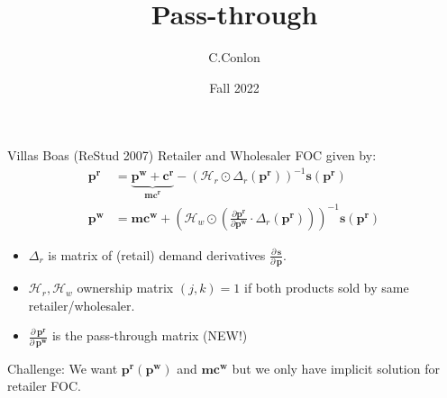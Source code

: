 

\title []{Pass-through}
\author{C.Conlon }
\date{Fall 2022}


\begin{frame}
\titlepage
\end{frame}






\begin{frame}{Villas Boas (ReStud 2007)}
Retailer and Wholesaler FOC given by:
\begin{align*}
\mathbf{p^r} &= \underbrace{\mathbf{p^w} +\mathbf{c^r}}_{\mathbf{mc^r}} -(\mathcal{H}_r \odot \Delta_{r}(\mathbf{p^r}))^{-1} \mathbf{s}(\mathbf{p^r})\\
\mathbf{p^w}  &= \mathbf{mc^w} + \left(\mathcal{H}_{w} \odot \left( \frac{\partial \mathbf{p^r}}{\partial \mathbf{p^w}} \cdot  \Delta_r(\mathbf{p^r} ) \right) \right)^{-1} \mathbf{s}(\mathbf{p^r})
\end{align*}
\begin{itemize}
  \item $\Delta_r$ is matrix of (retail) demand derivatives $\frac{\partial\, \mathbf{s}}{\partial\, \mathbf{p}}$.
\item $\mathcal{H}_r,\mathcal{H}_w$  ownership matrix $(j,k)=1$ if both products sold by same retailer/wholesaler.
\item $\frac{\partial\, \mathbf{p^r}}{\partial\, \mathbf{p^w}}$ is the \alert{pass-through matrix} (NEW!)
\end{itemize}
Challenge: We want $\mathbf{p^r}(\mathbf{p^w})$ and $\mathbf{mc^w}$ but we only have implicit solution for retailer FOC.
\end{frame}

